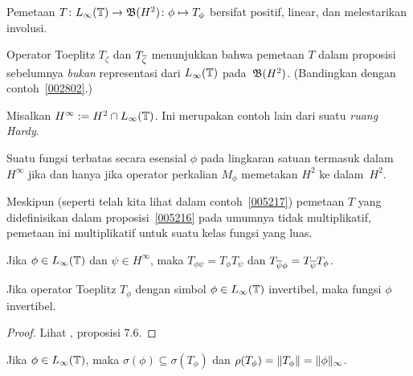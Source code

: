 \begin{prop}\label{005216} Pemetaan $T\colon L_\infty(\mathbb{T}) \rightarrow \mathfrak{B}(H^2)\colon \phi
\mapsto T_\phi$ bersifat positif, linear, dan melestarikan involusi.
\end{prop}

\begin{exam}\label{005217} Operator Toeplitz $T_\zeta$ dan $T_{\overline{\zeta}}$ menunjukkan bahwa
pemetaan $T$ dalam proposisi sebelumnya \emph{bukan} representasi dari $L_\infty(\mathbb{T})$
pada~$\mathfrak{B}(H^2)$. (Bandingkan dengan contoh~\ref{002802}.)
\end{exam}

\begin{notn} Misalkan $H^\infty := H^2 \cap L_\infty(\mathbb{T})$.
Ini merupakan contoh lain dari suatu \emph{ruang Hardy}.
\end{notn}

\begin{prop} Suatu fungsi terbatas secara esensial $\phi$ pada lingkaran satuan termasuk dalam
$H^\infty$ jika dan hanya jika operator perkalian $M_\phi$ memetakan $H^2$ ke dalam~$H^2$.
\end{prop}

Meskipun (seperti telah kita lihat dalam contoh~\ref{005217}) pemetaan $T$ yang didefinisikan dalam
proposisi~\ref{005216} pada umumnya tidak multiplikatif, pemetaan ini multiplikatif untuk suatu
kelas fungsi yang luas.

\begin{prop} Jika $\phi \in L_\infty(\mathbb{T})$ dan $\psi \in H^\infty$, maka $T_{\phi\psi} =
T_\phi T_\psi$ dan $T_{\overline{\psi} \phi} = T_{\overline{\psi}} T_\phi$.
\end{prop}

\begin{prop} Jika operator Toeplitz $T_\phi$ dengan simbol $\phi \in L_\infty(\mathbb{T})$
invertibel, maka fungsi $\phi$ invertibel.
\end{prop}

\begin{proof} Lihat \cite{Douglas:1972}, proposisi 7.6. \ns \end{proof}

\begin{thm} Jika $\phi \in L_\infty(\mathbb{T})$,
maka $\sigma(\phi) \subseteq \sigma(T_\phi)$ dan $\rho(T_\phi) = \lVert T_\phi\rVert =
\lVert\phi\rVert_\infty$.
\end{thm}

